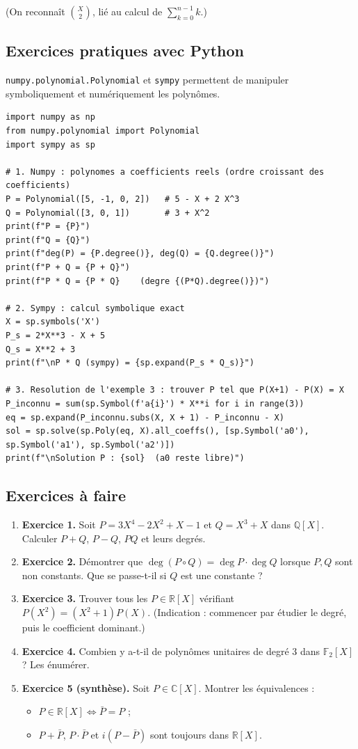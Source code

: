 \documentclass[12pt,a4paper]{report}
\theoremstyle{definition}
\theoremstyle{remark}
\begin{document}
(On reconnaît $\binom{X}{2}$, lié au calcul de $\sum_{k=0}^{n-1} k$.)

\subsection{Exercices pratiques avec Python}
\texttt{numpy.polynomial.Polynomial} et \texttt{sympy} permettent de manipuler symboliquement et numériquement les polynômes.

\begin{lstlisting}
import numpy as np
from numpy.polynomial import Polynomial
import sympy as sp

# 1. Numpy : polynomes a coefficients reels (ordre croissant des coefficients)
P = Polynomial([5, -1, 0, 2])   # 5 - X + 2 X^3
Q = Polynomial([3, 0, 1])       # 3 + X^2
print(f"P = {P}")
print(f"Q = {Q}")
print(f"deg(P) = {P.degree()}, deg(Q) = {Q.degree()}")
print(f"P + Q = {P + Q}")
print(f"P * Q = {P * Q}    (degre {(P*Q).degree()})")

# 2. Sympy : calcul symbolique exact
X = sp.symbols('X')
P_s = 2*X**3 - X + 5
Q_s = X**2 + 3
print(f"\nP * Q (sympy) = {sp.expand(P_s * Q_s)}")

# 3. Resolution de l'exemple 3 : trouver P tel que P(X+1) - P(X) = X
P_inconnu = sum(sp.Symbol(f'a{i}') * X**i for i in range(3))
eq = sp.expand(P_inconnu.subs(X, X + 1) - P_inconnu - X)
sol = sp.solve(sp.Poly(eq, X).all_coeffs(), [sp.Symbol('a0'), sp.Symbol('a1'), sp.Symbol('a2')])
print(f"\nSolution P : {sol}  (a0 reste libre)")
\end{lstlisting}

\subsection{Exercices à faire}
\begin{enumerate}
    \item \textbf{Exercice 1.} Soit $P = 3X^4 - 2X^2 + X - 1$ et $Q = X^3 + X$ dans $\mathbb{Q}[X]$. Calculer $P + Q$, $P - Q$, $PQ$ et leurs degrés.
    \item \textbf{Exercice 2.} Démontrer que $\deg(P \circ Q) = \deg P \cdot \deg Q$ lorsque $P, Q$ sont non constants. Que se passe-t-il si $Q$ est une constante ?
    \item \textbf{Exercice 3.} Trouver tous les $P \in \mathbb{R}[X]$ vérifiant $P(X^2) = (X^2 + 1) P(X)$. (Indication : commencer par étudier le degré, puis le coefficient dominant.)
    \item \textbf{Exercice 4.} Combien y a-t-il de polynômes unitaires de degré $3$ dans $\mathbb{F}_2[X]$ ? Les énumérer.
    \item \textbf{Exercice 5 (synthèse).} Soit $P \in \mathbb{C}[X]$. Montrer les équivalences :
    \begin{itemize}
        \item $P \in \mathbb{R}[X] \iff \bar{P} = P$ ;
        \item $P + \bar{P}$, $P \cdot \bar{P}$ et $i(P - \bar{P})$ sont toujours dans $\mathbb{R}[X]$.
    \end{itemize}
\end{enumerate}
\end{document}
